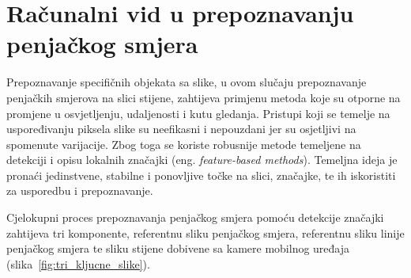 \chapter{Računalni vid u prepoznavanju penjačkog smjera}

Prepoznavanje specifičnih objekata sa slike, u ovom slučaju prepoznavanje penjačkih smjerova na slici stijene, zahtijeva primjenu metoda koje su otporne na promjene u osvjetljenju, udaljenosti i kutu gledanja. Pristupi koji se temelje na uspoređivanju piksela slike su neefikasni i nepouzdani jer su osjetljivi na spomenute varijacije. Zbog toga se koriste robusnije metode temeljene na detekciji i opisu lokalnih značajki (eng. \textit{feature-based methods}). Temeljna ideja je pronaći jedinstvene, stabilne i ponovljive točke na slici, značajke, te ih iskoristiti za usporedbu i prepoznavanje.

Cjelokupni proces prepoznavanja penjačkog smjera pomoću detekcije značajki zahtijeva tri komponente, referentnu sliku penjačkog smjera, referentnu sliku linije penjačkog smjera te sliku stijene dobivene sa kamere mobilnog uređaja (slika~\ref{fig:tri_kljucne_slike}).

